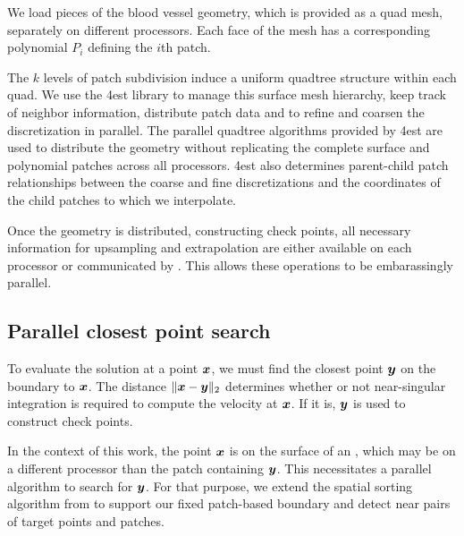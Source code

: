 We load pieces of the blood vessel geometry, which is provided as a
quad mesh, separately on different processors. Each face of the 
mesh has a corresponding polynomial $P_i$ defining the $i$th patch.

The $k$ levels of patch subdivision induce a uniform quadtree structure within each quad.
We use the \p4est library \cite{BursteddeWilcoxGhattas11} to manage
this surface mesh hierarchy, keep track of neighbor information,
distribute patch data and to refine and coarsen the discretization in
parallel.  
The parallel quadtree algorithms provided by \p4est are used to
distribute the geometry without replicating the complete surface and
polynomial patches across all processors.
\p4est also determines parent-child patch relationships between the coarse and fine discretizations and the coordinates of the child patches to which we interpolate.

Once the geometry is distributed, constructing check points, all necessary information for upsampling and extrapolation are either available on each processor or communicated by \pvfmm. 
This allows these operations to be embarassingly parallel.
  
\subsection{Parallel closest point search}
\label{sec:closest_point}
To evaluate the solution at a point ${\bm{x}}$, we must find the closest point ${\bm{y}}$
on the boundary to ${\bm{x}}$.
The distance $\|{\bm{x}} -{\bm{y}}\|_2$ determines whether or not near-singular
integration is required to compute the velocity at ${\bm{x}}$.
If it is, ${\bm{y}}$ is used to construct check points. 

In the context of this work, the point ${\bm{x}}$ is on the surface of an \rbc, which
may be on a different processor than the patch containing ${\bm{y}}$.
This necessitates a parallel algorithm to search for ${\bm{y}}$.
%
% 
For that purpose, we extend the spatial sorting algorithm from \cite[Algorithm 1]{lu2018parallel} to support our fixed patch-based boundary and detect near pairs of target points and patches.

